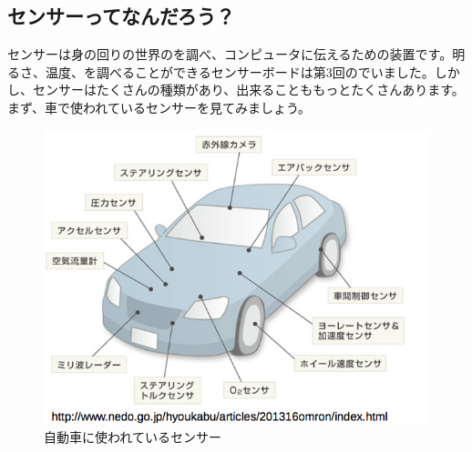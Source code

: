 \subsection{センサーってなんだろう？}
センサーは身の回りの世界のを調べ、コンピュータに伝えるための装置です。明るさ、温度、を調べることができるセンサーボードは第3回のでいました。しかし、センサーはたくさんの種類があり、出来ることももっとたくさんあります。まず、車で使われているセンサーを見てみましょう。
\begin{figure}[htb]
\begin{center}
    \includegraphics[scale=1.0]{images/chap05/text05-img001.png}
    \caption{自動車に使われているセンサー}
    \label{fig1}
\end{center}
\end{figure}
